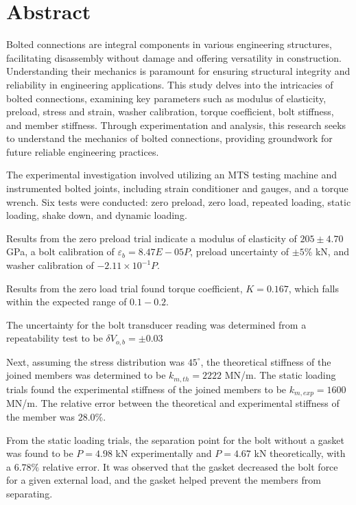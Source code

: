 \section*{Abstract}
    Bolted connections are integral components in various engineering structures, facilitating disassembly without damage and offering versatility in construction. Understanding their mechanics is paramount for ensuring structural integrity and reliability in engineering applications. This study delves into the intricacies of bolted connections, examining key parameters such as modulus of elasticity, preload, stress and strain, washer calibration, torque coefficient, bolt stiffness, and member stiffness. Through experimentation and analysis, this research seeks to understand the mechanics of bolted connections, providing groundwork for future reliable engineering practices.

    The experimental investigation involved utilizing an MTS testing machine and instrumented bolted joints, including strain conditioner and gauges, and a torque wrench. Six tests were conducted: zero preload, zero load, repeated loading, static loading, shake down, and dynamic loading. 

    Results from the zero preload trial indicate a modulus of elasticity of $205 \pm 4.70$ GPa, a bolt calibration of $\varepsilon_{b} = 8.47E-05 P$, preload uncertainty of $\pm 5\%$ kN, and washer calibration of $-2.11 \times 10^{-1}P$. 
    
    Results from the zero load trial found torque coefficient, $K = 0.167$, which falls within the expected range of $0.1 - 0.2$. 
    
    The uncertainty for the bolt transducer reading was determined from a repeatability test to be $\delta V_{o, b} =\pm 0.03$
    
    Next, assuming the stress distribution was $45^{\circ}$, the theoretical stiffness of the joined members was determined to be $k_{m, th} = 2222$ MN/m. The static loading trials found the experimental stiffness of the joined members to be $k_{m, exp} = 1600$ MN/m. The relative error between the theoretical and experimental  stiffness of the member was $28.0\%$. 

    From the static loading trials, the separation point for the bolt without a gasket was found to be $P = 4.98$ kN experimentally and $P = 4.67$ kN theoretically, with a $6.78\%$ relative error. It was observed that the gasket decreased the bolt force for a given external load, and the gasket helped prevent the members from separating.

